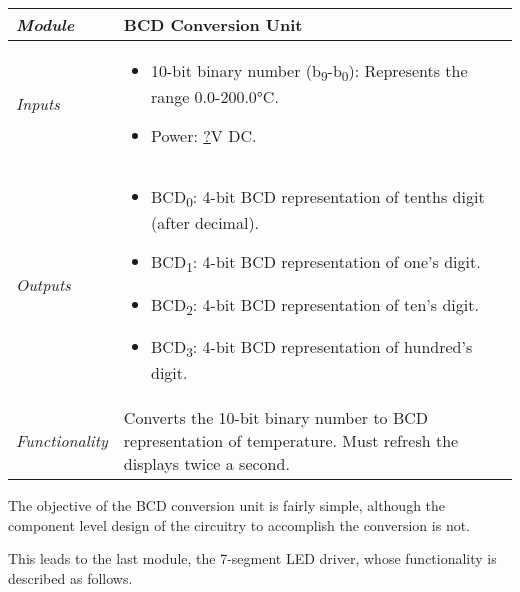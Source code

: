 \begin{table}
\begin{tabular}{|l|m{10cm}|}
\hline
\emph{Module} & BCD Conversion Unit\\ \hline
\emph{Inputs} & 
\begin{itemize}
\item
  10-bit binary number (b\textsubscript{9}-b\textsubscript{0}):
  Represents the range 0.0-200.0°C.
\item
  Power: \ul{?}V DC.
\end{itemize}  \\ \hline
\emph{Outputs} & 
\begin{itemize}
\item
  BCD\textsubscript{0}: 4-bit BCD representation of tenths digit (after
  decimal).
\item
  BCD\textsubscript{1}: 4-bit BCD representation of one's digit.
\item
  BCD\textsubscript{2}: 4-bit BCD representation of ten's digit.
\item
  BCD\textsubscript{3}: 4-bit BCD representation of hundred's digit.
\end{itemize}\\ \hline
\emph{Functionality} & Converts the 10-bit binary number to BCD
representation of temperature. Must refresh the displays twice a
second. \\ \hline
\end{tabular}
\end{table}



The objective of the BCD conversion unit is fairly simple, although the
component level design of the circuitry to accomplish the conversion is
not.

This leads to the last module, the 7-segment LED driver, whose
functionality is described as follows.

